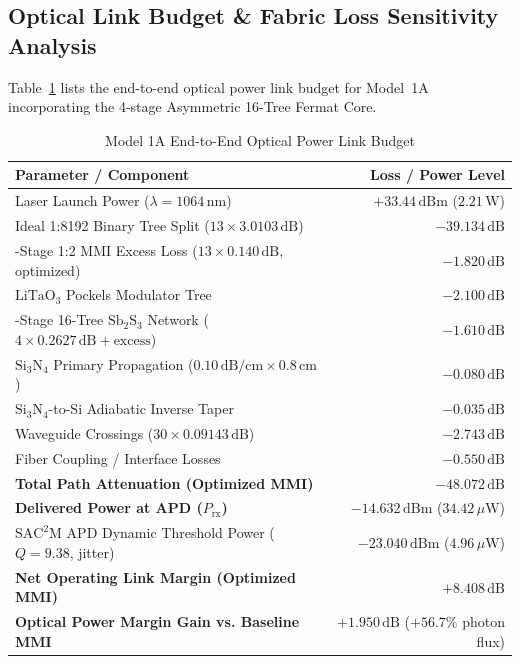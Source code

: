 \documentclass[journal]{IEEEtran}
\begin{document}
\subsection{Optical Link Budget \& Fabric Loss Sensitivity Analysis}
Table~\ref{tab:link_budget} lists the end-to-end optical power link budget for Model~1A incorporating the 4-stage Asymmetric 16-Tree Fermat Core.

\begin{table}[!htbp]
\centering
\footnotesize
\caption{Model 1A End-to-End Optical Power Link Budget}
\label{tab:link_budget}
\begin{tabularx}{\columnwidth}{>{\raggedright\arraybackslash}X r}
\toprule
\textbf{Parameter / Component} & \textbf{Loss / Power Level} \\
\midrule
Laser Launch Power ($\lambda=1064\,\mathrm{nm}$) & $+33.44\,\mathrm{dBm}$ ($2.21\,\mathrm{W}$) \\
Ideal 1:8192 Binary Tree Split ($13 \times 3.0103\,\mathrm{dB}$) & $-39.134\,\mathrm{dB}$ \\
13-Stage 1:2 MMI Excess Loss ($13 \times \mathbf{0.140\,\mathrm{dB}}$, optimized) & $\mathbf{-1.820\,\mathrm{dB}}$ \\
$\mathrm{LiTaO_3}$ Pockels Modulator Tree & $-2.100\,\mathrm{dB}$ \\
4-Stage 16-Tree $\mathrm{Sb_2S_3}$ Network ($4 \times 0.2627\,\mathrm{dB} + \text{excess}$) & $-1.610\,\mathrm{dB}$ \\
$\mathrm{Si_3N_4}$ Primary Propagation ($0.10\,\mathrm{dB/cm} \times 0.8\,\mathrm{cm}$) & $-0.080\,\mathrm{dB}$ \\
$\mathrm{Si_3N_4}$-to-$\mathrm{Si}$ Adiabatic Inverse Taper & $-0.035\,\mathrm{dB}$ \\
Waveguide Crossings ($30 \times 0.09143\,\mathrm{dB}$) & $-2.743\,\mathrm{dB}$ \\
Fiber Coupling / Interface Losses & $-0.550\,\mathrm{dB}$ \\
\midrule
\textbf{Total Path Attenuation (Optimized MMI)} & $\mathbf{-48.072\,\mathrm{dB}}$ \\
\textbf{Delivered Power at APD ($P_{\mathrm{rx}}$)} & $\mathbf{-14.632\,\mathrm{dBm}}$ ($34.42\,\mu\mathrm{W}$) \\
$\mathrm{SAC^2M}$ APD Dynamic Threshold Power ($Q=9.38$, jitter) & $-23.040\,\mathrm{dBm}$ ($4.96\,\mu\mathrm{W}$) \\
\midrule
\textbf{Net Operating Link Margin (Optimized MMI)} & $\mathbf{+8.408\,\mathrm{dB}}$ \\
\textbf{Optical Power Margin Gain vs. Baseline MMI} & $\mathbf{+1.950\,\mathrm{dB}}$ ($+56.7\%$ photon flux) \\
\bottomrule
\end{tabularx}
\end{table}
\end{document}

